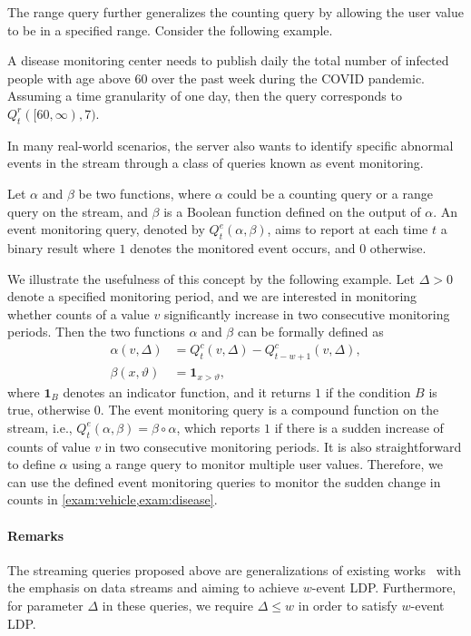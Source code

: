 \documentclass[acmsmall]{acmart}
\newcommand{\indr}[1]{\mathbf{1}_{#1}}
\begin{document}
The range query further generalizes the counting query by allowing the user value to
be in a specified range.
Consider the following example.

\begin{example}\label{exam:disease}
  A disease monitoring center needs to publish daily the total number of
  infected people with age above $60$ over the past week during the COVID
  pandemic.
  Assuming a time granularity of one day, then the query corresponds to $Q_t^r([60,
  \infty), 7)$.
\end{example}

In many real-world scenarios, the server also wants to identify specific
abnormal events in the stream through a class of queries known as event
monitoring.

\begin{definition}\label{def:event_monitoring}
  Let $\alpha$ and $\beta$ be two functions, where $\alpha$ could be a counting
  query or a range query on the stream, and $\beta$ is a Boolean function defined
  on the output of $\alpha$.
  An event monitoring query, denoted by $Q_t^e(\alpha,\beta)$, aims to report at
  each time $t$ a binary result where $1$ denotes the monitored event occurs,
  and $0$ otherwise.
\end{definition}

We illustrate the usefulness of this concept by the following example.
Let $\Delta>0$ denote a specified monitoring period, and we are interested in
monitoring whether counts of a value $v$ significantly increase in two
consecutive monitoring periods.
Then the two functions $\alpha$ and $\beta$ can be formally defined as
\begin{align*}
  \alpha(v,\Delta) &= Q_t^c(v, \Delta) - Q_{t-w+1}^c(v, \Delta), \\
  \beta(x,\vartheta) &= \indr{x>\vartheta},
\end{align*}
where $\indr{B}$ denotes an indicator function, and it returns $1$ if the
condition $B$ is true, otherwise $0$.
The event monitoring query is a compound function on the stream, i.e.,
$Q_t^e(\alpha,\beta)= \beta\circ\alpha$, which reports $1$ if there is a sudden
increase of counts of value $v$ in two consecutive monitoring periods.
It is also straightforward to define $\alpha$ using a range query to monitor
multiple user values.
Therefore, we can use the defined event monitoring queries to monitor the sudden
change in counts in \cref{exam:vehicle,exam:disease}.

\paragraph{Remarks}
The streaming queries proposed above are generalizations of existing
works~\cite{Kellaris2014,Chen2017} with the emphasis on data streams and aiming
to achieve $w$-event LDP.
Furthermore, for parameter $\Delta$ in these queries, we require $\Delta \leq w$
in order to satisfy $w$-event LDP.
\end{document}
